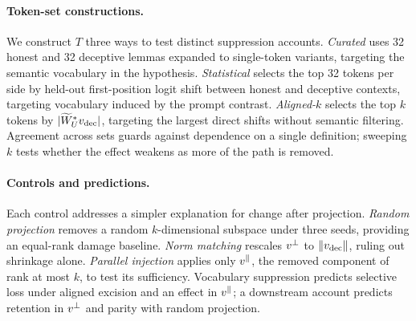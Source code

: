 \paragraph{Token-set constructions.}
We construct $T$ three ways to test distinct suppression accounts. \emph{Curated} uses 32 honest and 32 deceptive lemmas expanded to single-token variants, targeting the semantic vocabulary in the hypothesis. \emph{Statistical} selects the top 32 tokens per side by held-out first-position logit shift between honest and deceptive contexts, targeting vocabulary induced by the prompt contrast. \emph{Aligned-$k$} selects the top $k$ tokens by $|\widetilde{W}_{U}^{*}v_{\mathrm{dec}}|$, targeting the largest direct shifts without semantic filtering. Agreement across sets guards against dependence on a single definition; sweeping $k$ tests whether the effect weakens as more of the path is removed.

\paragraph{Controls and predictions.}
Each control addresses a simpler explanation for change after projection. \emph{Random projection} removes a random $k$-dimensional subspace under three seeds, providing an equal-rank damage baseline. \emph{Norm matching} rescales $v^{\perp}$ to $\|v_{\mathrm{dec}}\|$, ruling out shrinkage alone. \emph{Parallel injection} applies only $v^{\parallel}$, the removed component of rank at most $k$, to test its sufficiency. Vocabulary suppression predicts selective loss under aligned excision and an effect in $v^{\parallel}$; a downstream account predicts retention in $v^{\perp}$ and parity with random projection.
